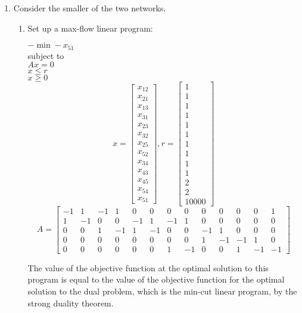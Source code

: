 \documentclass{article}
\begin{document}
\begin{enumerate}
\newpage
\item

Consider the smaller of the two networks. 

\begin{enumerate}
\item
Set up a max-flow linear program:

$-\min -x_{51}$ \\
subject to \\
$Ax = 0$\\
$x \leq r$ \\
$x \geq 0$ \\

$$
x = 
\begin{bmatrix}
x_{12} \\
x_{21} \\
x_{13} \\
x_{31} \\
x_{23} \\
x_{32} \\
x_{25} \\
x_{52} \\
x_{34} \\
x_{43} \\
x_{45} \\
x_{54} \\
x_{51} 
\end{bmatrix},
r = 
\begin{bmatrix}
1 \\
1\\
1\\
1\\
1\\
1\\
1\\
1\\
1\\
1\\
2\\
2\\
10000
\end{bmatrix}
$$
$$
A = 
\begin{bmatrix}
-1 &1 &-1& 1& 0 &0 &0& 0& 0 &0 &0& 0& 1 \\
1 &-1 &0 &0& -1 &1 &-1& 1 &0 &0 &0& 0 &0 \\
0 &0 &1& -1 &1 &-1 &0& 0 &-1& 1 &0 &0 &0\\
0 &0& 0& 0 &0 &0 &0 &0 &1& -1& -1 &1& 0\\
0 &0 &0& 0 &0 &0& 1& -1 &0 &0 &1& -1& -1
\end{bmatrix}
$$

The value of the objective function at the optimal solution to this program is equal to the value of the objective function for the optimal solution to the  dual problem, which is the min-cut linear program, by the strong duality theorem.


\end{enumerate}
\end{enumerate}
\end{document}
